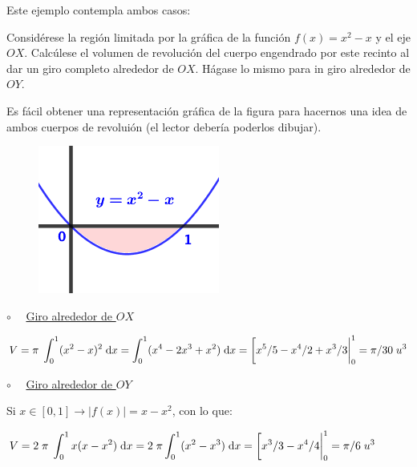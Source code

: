 \begin{ejem}
Este ejemplo contempla ambos casos:

\begin{multicols}{2}
	
Considérese la región limitada por la gráfica de la función  $f(x)=x^2-x$ y el eje $OX$. Calcúlese el volumen de revolución del cuerpo engendrado por este recinto al dar un giro completo alrededor de $OX$. Hágase lo mismo para in giro alrededor de $OY$.

\vspace{2mm}

Es fácil obtener una representación gráfica de la figura para hacernos una idea de ambos cuerpos de revoluión (el lector debería poderlos dibujar).
 
	\begin{figure}[H]
	\centering
	\includegraphics[width=.4\textwidth]{imagenes/imagenes08/T08IM24.png}
	\end{figure}
\end{multicols}
	
$\circ \quad$ \underline{Giro alrededor de $OX$}

$\displaystyle V=\pi\; \int_0^1 (x^2-x)^2\; \dd x = \int_0^1 (x^4-2x^3+x^2)\; \dd x= \eval[x^5/5-x^4/2+x^3/3|_0^1= \pi/30 \; u^3$

$\circ \quad$ \underline{Giro alrededor de $OY$}

Si $x\in[0,1]\to |f(x)|=x-x^2$, con lo que:

$\displaystyle V=2\; \pi\; \int_0^1 x(x-x^2)\; \dd x= 2\; \pi \int_0^1 (x^2-x^3)\; \dd x = \eval [x^3/3-x^4/4|_0^1=\pi/6\; u^3$
	 
\end{ejem}

